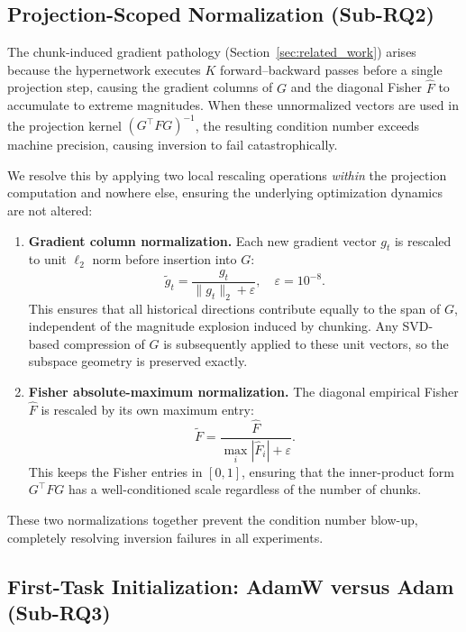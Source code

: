 \subsection{Projection-Scoped Normalization (Sub-RQ2)}
\label{sec:normalization}

The chunk-induced gradient pathology (Section~\ref{sec:related_work}) arises
because the hypernetwork executes $K$ forward–backward passes before a single
projection step, causing the gradient columns of $G$ and the diagonal Fisher
$\hat{F}$ to accumulate to extreme magnitudes.  When these unnormalized vectors
are used in the projection kernel $(G^\top F G)^{-1}$, the resulting condition
number exceeds machine precision, causing inversion to fail catastrophically.

We resolve this by applying two local rescaling operations \emph{within} the
projection computation and nowhere else, ensuring the underlying optimization
dynamics are not altered:

\begin{enumerate}
    \item \textbf{Gradient column normalization.}  Each new gradient vector
    $g_t$ is rescaled to unit $\ell_2$ norm before insertion into $G$:
    \begin{equation}
        \tilde{g}_t = \frac{g_t}{\|g_t\|_2 + \varepsilon}, \quad \varepsilon = 10^{-8}.
    \end{equation}
    This ensures that all historical directions contribute equally to the span
    of $G$, independent of the magnitude explosion induced by chunking.
    Any SVD-based compression of $G$ is subsequently applied to these unit
    vectors, so the subspace geometry is preserved exactly.

    \item \textbf{Fisher absolute-maximum normalization.}  The diagonal
    empirical Fisher $\hat{F}$ is rescaled by its own maximum entry:
    \begin{equation}
        \tilde{F} = \frac{\hat{F}}{\max_i |\hat{F}_i| + \varepsilon}.
    \end{equation}
    This keeps the Fisher entries in $[0, 1]$, ensuring that the inner-product
    form $G^\top F G$ has a well-conditioned scale regardless of the
    number of chunks.
\end{enumerate}
These two normalizations together prevent the condition number blow-up,
completely resolving inversion failures in all experiments.

\subsection{First-Task Initialization: AdamW versus Adam (Sub-RQ3)}
\label{sec:adamw}

